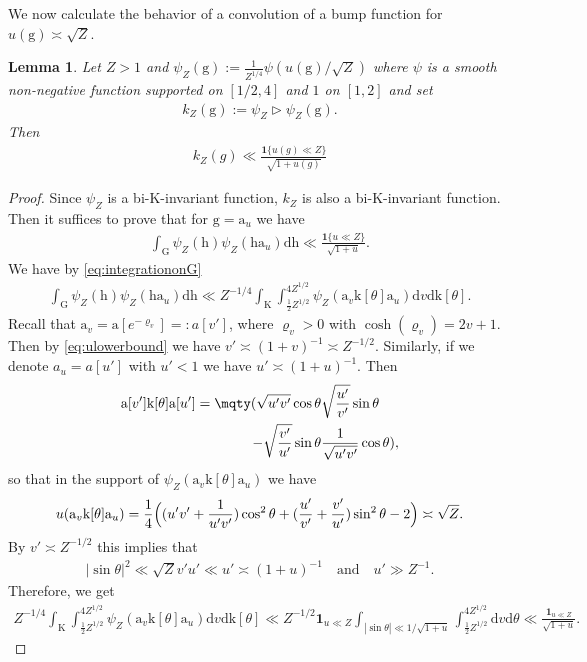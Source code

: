 \documentclass[12pt]{amsart}
\newtheorem{lemma}[theorem]{Lemma}
\theoremstyle{definition}
\theoremstyle{remark}
\numberwithin{equation}{section}
\newcommand{\K}{\mathrm{K}}
\newcommand{\G}{\mathrm{G}}
\newcommand{\1}{{\mathbf 1}}
\renewcommand{\a}{\mathrm{a}}
\renewcommand{\k}{\mathrm{k}}
\newcommand{\g}{\mathrm{g}}
\newcommand{\h}{\mathrm{h}}
\renewcommand{\d}{\mathrm d}
\begin{document}
We now calculate the behavior of a convolution of a bump function for $u(\g) \asymp \sqrt{Z}$.
\begin{lemma}\label{lem:k_Zupperbound}
 Let $Z > 1$ and $\psi_Z(\g):=\frac{1}{Z^{1/4}}\psi(u(\g)/\sqrt{Z})$ where $\psi$ is a smooth non-negative function supported on $[1/2,4]$ and $1$ on $[1,2]$ and set
 \begin{align*}
     k_Z(\g) := \psi_Z \rhd \psi_Z(\g).
 \end{align*}
 Then
 \begin{align*}
     k_Z(g) \ll \frac{\mathbf{1}\{  u(g) \ll Z \}}{\sqrt{1+u(g)}}
 \end{align*}
\end{lemma}
\begin{proof}
   Since $\psi_Z$ is a bi-$\K$-invariant function, $k_Z$ is also a bi-$\K$-invariant function. Then it suffices to prove that for $\g = \a_u$ we have
\begin{align*}
    \int_{\G} \psi_Z(\h) \psi_Z(\h \a_u ) \d \h \ll   \frac{\mathbf{1}\{ u \ll Z\}}{\sqrt{1+u}}.
\end{align*}
We have by \eqref{eq:integrationonG}
\begin{align*}
    \int_{\G} \psi_Z(\h) \psi_Z(\h \a_u ) \d \h \ll   Z^{-1/4} \int_{\K} \int_{\frac{1}{2}Z^{1/2}}^{4 Z^{1/2}}  \psi_Z(\a_v \k[\theta] \a_u ) \d v \d \k[\theta].
\end{align*}
Recall that $\a_v = \a[e^{-\varrho_v}] =: a[v']$, where $\varrho_v > 0$ with $\cosh(\varrho_v) = 2v+1$. Then by \eqref{eq:ulowerbound} we have $v' \asymp (1+v)^{-1} \asymp Z^{-1/2}$. Similarly, if we denote $a_u = a[u']$ with $u'< 1$ we have $u' \asymp (1+u)^{-1}$.
Then
\begin{align*}
 \a[v'] \k[\theta] \a[u'] = \mqty(\sqrt{u'v'} \cos \theta & \sqrt{\frac{u'}{v'}}\sin \theta \\ -\sqrt{\frac{v'}{u'}}\sin \theta &  \frac{1}{\sqrt{u'v'}}\cos \theta),
\end{align*}
so that in the support of $\psi_Z(\a_v \k[\theta] \a_u ) $ we have
\begin{align*}
    u(\a_v \k[\theta] \a_u) =\frac{1}{4} \Bigl((u'v' + \frac{1}{u'v'}) \cos^2 \theta  + (\frac{u'}{v'}+\frac{v'}{u'}) \sin^2 \theta  -2 \Bigr) \asymp \sqrt{Z}.
\end{align*}
By $v' \asymp Z^{-1/2}$ this implies that
\begin{align*}
  |\sin \theta|^2 \ll \sqrt{Z} v'u' \ll  u' \asymp (1+u)^{-1} \quad \text{and} \quad u' \gg Z^{-1}.
\end{align*}
Therefore,  we get
\begin{align*}
 Z^{-1/4}   \int_{\K} \int_{\frac{1}{2}Z^{1/2}}^{4 Z^{1/2}}  \psi_Z(\a_v \k[\theta] \a_u ) \d v \d \k[\theta] \ll  Z^{-1/2}\mathbf{1}_{u \ll Z} \int_{|\sin \theta|\ll 1/\sqrt{1+u}} \int_{\frac{1}{2}Z^{1/2}}^{4 Z^{1/2}}  \d v \d \theta   \ll  \frac{\mathbf{1}_{u \ll Z}}{\sqrt{1+u }}.
\end{align*}
\end{proof}
\end{document}
